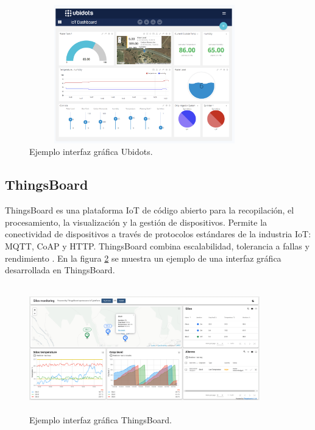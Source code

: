 \begin{figure}[htbp]
	\centering
	\includegraphics[width=10cm, height=6cm]{./Figures/ubidots.png}
	\caption{Ejemplo interfaz gráfica Ubidots\protect\footnotemark.}
	\label{fig:InterfazUBIDOTS}
\end{figure}
\subsection{ThingsBoard}
ThingsBoard es una plataforma IoT de código abierto para la recopilación, el procesamiento, la visualización y la gestión de dispositivos.
Permite la conectividad de dispositivos a través de protocolos estándares de la industria IoT: MQTT, CoAP y HTTP. ThingsBoard combina escalabilidad, tolerancia a fallas y rendimiento \citep{THINGSBOARD}. En la figura \ref{fig:InterfazThingsBoard} se muestra un ejemplo de una interfaz gráfica desarrollada en ThingsBoard. 

\begin{figure}[htbp]
	\centering
	\includegraphics[width=10cm, height=5.5cm]{./Figures/thingsboard.png}
	\caption{Ejemplo interfaz gráfica ThingsBoard\protect\footnotemark.}
	\label{fig:InterfazThingsBoard}
\end{figure}